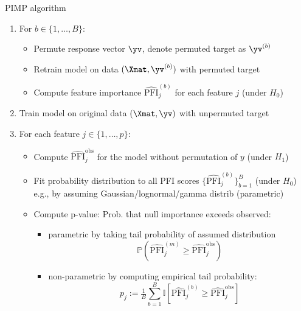 \documentclass[10pt,compress,t,notes=noshow, xcolor=table]{beamer}
\begin{document}
\begin{frame}{PIMP algorithm}

\begin{enumerate}
	\item<1-3> For $b \in \{1, \ldots, B\}$:
		\begin{itemize}
			\item Permute response vector $\yv$, denote permuted target as $\yv^{(b)}$
			\item Retrain model on data $(\Xmat, \yv^{(b)})$ with permuted target 
			\item Compute feature importance $\widehat{\text{PFI}}_j^{(b)}$ for each feature $j$ (under $H_0$)
		\end{itemize}
	\item<2-3> Train model on original data  $(\Xmat, \yv)$ with unpermuted target
	\item<3> For each feature $j \in \{1,\ldots,p\}$:
		\begin{itemize}
			\item Compute $\widehat{\text{PFI}}_j^{\text{obs}}$ for the model without permutation of $y$ (under $H_1$)
			\item Fit probability distribution to all PFI scores $\{\widehat{\text{PFI}}_j^{(b)}\}_{b=1}^{B}$ (under $H_0$)\\
            e.g., by assuming Gaussian/lognormal/gamma distrib (parametric)%
			\item Compute p-value: Prob. that null importance exceeds observed: 
            \begin{itemize}
                \item parametric by taking tail probability of assumed distribution $$\mathbb{P}(\widehat{\text{PFI}}_j^{(m)} \geq \widehat{\text{PFI}}_j^{\text{obs}})$$
                \item non-parametric by computing empirical tail probability: 
                $$p_j := \tfrac{1}{B} \textstyle \sum_{b=1}^{B} \mathbb{I}[\widehat{\text{PFI}}_j^{(b)} \geq \widehat{\text{PFI}}_j^{\text{obs}}]$$
            \end{itemize}

		\end{itemize}
\end{enumerate}
\end{frame}
\end{document}
